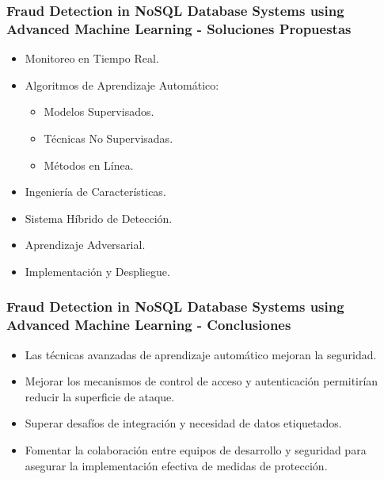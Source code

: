 \begin{frame}
    \frametitle{Fraud Detection in NoSQL Database Systems using Advanced Machine Learning - Soluciones Propuestas}
    \begin{itemize}
        \item Monitoreo en Tiempo Real.
         
        \item Algoritmos de Aprendizaje Automático:
        \begin{itemize}
            \item Modelos Supervisados.
             
            \item Técnicas No Supervisadas.
             
            \item Métodos en Línea.
             
        \end{itemize}
        \item Ingeniería de Características.
         
        \item Sistema Híbrido de Detección.
         
        \item Aprendizaje Adversarial.
         
        \item Implementación y Despliegue.
    \end{itemize}
\end{frame}

\begin{frame}
    \frametitle{Fraud Detection in NoSQL Database Systems using Advanced Machine Learning - Conclusiones}
    \begin{itemize}
        \item Las técnicas avanzadas de aprendizaje automático mejoran la seguridad.
         
        \item Mejorar los mecanismos de control de acceso y autenticación permitirían reducir la superficie de ataque.
         
        \item Superar desafíos de integración y necesidad de datos etiquetados.
         
        \item  Fomentar la colaboración entre equipos de desarrollo y seguridad para asegurar la implementación efectiva de medidas de protección.
    \end{itemize}
\end{frame}

